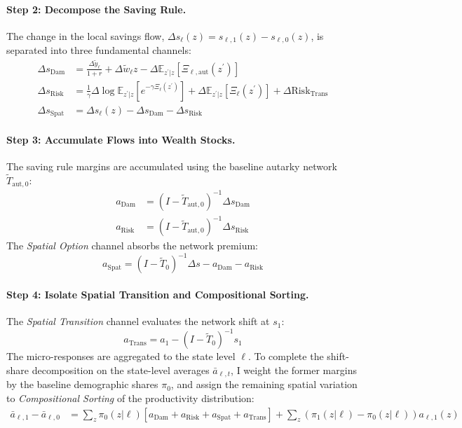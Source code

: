 \documentclass[11pt, a4paper]{article}
\begin{document}
\paragraph{Step 2: Decompose the Saving Rule.}
The change in the local savings flow, $\Delta s_{\ell}(z) = s_{\ell,1}(z) - s_{\ell,0}(z)$, is separated into three fundamental channels:
\begin{align}
    \Delta s_{\text{Dam}} &= \frac{\Delta \tilde{y}_\ell}{1+r} + \Delta \tilde{w}_\ell z - \Delta \mathbb{E}_{z^\prime|z}[\Xi_{\ell,\text{aut}}(z^\prime)] \\
    \Delta s_{\text{Risk}} &= \frac{1}{\gamma} \Delta \log \mathbb{E}_{z^\prime|z}[e^{-\gamma \Xi_{\ell}(z^\prime)}] + \Delta \mathbb{E}_{z^\prime|z}[\Xi_{\ell}(z^\prime)] + \Delta \text{Risk}_{\text{Trans}} \\
    \Delta s_{\text{Spat}} &= \Delta s_{\ell}(z) - \Delta s_{\text{Dam}} - \Delta s_{\text{Risk}}
\end{align}

\paragraph{Step 3: Accumulate Flows into Wealth Stocks.}
The saving rule margins are accumulated using the baseline autarky network $\tilde{T}_{\text{aut}, 0}$:
\begin{align}
    a_{\text{Dam}} &= (I - \tilde{T}_{\text{aut}, 0})^{-1} \Delta s_{\text{Dam}} \\
    a_{\text{Risk}} &= (I - \tilde{T}_{\text{aut}, 0})^{-1} \Delta s_{\text{Risk}}
\end{align}
The \textit{Spatial Option} channel absorbs the network premium:
\begin{equation}
    a_{\text{Spat}} = (I - \tilde{T}_0)^{-1} \Delta s - a_{\text{Dam}} - a_{\text{Risk}}
\end{equation}

\paragraph{Step 4: Isolate Spatial Transition and Compositional Sorting.}
The \textit{Spatial Transition} channel evaluates the network shift at $s_1$:
\begin{equation}
    a_{\text{Trans}} = a_1 - (I - \tilde{T}_0)^{-1} s_1
\end{equation}
The micro-responses are aggregated to the state level $\ell$. To complete the shift-share decomposition on the state-level averages $\bar{a}_{\ell,t}$, I weight the former margins by the baseline demographic shares $\pi_0$, and assign the remaining spatial variation to \textit{Compositional Sorting} of the productivity distribution:
\begin{align}
    \bar{a}_{\ell,1} - \bar{a}_{\ell,0} &= \sum_{z} \pi_0(z|\ell) \left[ a_{\text{Dam}} + a_{\text{Risk}} + a_{\text{Spat}} + a_{\text{Trans}} \right] + \sum_{z} \left( \pi_1(z|\ell) - \pi_0(z|\ell) \right) a_{\ell,1}(z)
\end{align}




\end{document}
